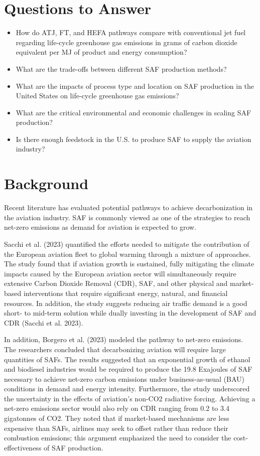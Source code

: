 \documentclass[12pt]{article}
\begin{document}
\begin{Appendix}
\section{Questions to Answer}
\begin{itemize}
    \item How do ATJ, FT, and HEFA pathways compare with conventional jet fuel regarding life-cycle greenhouse gas emissions in grams of carbon dioxide equivalent per MJ of product and energy consumption?
    \item What are the trade-offs between different SAF production methods?
    \item What are the impacts of process type and location on SAF production in the United States on life-cycle greenhouse gas emissions?
    \item What are the critical environmental and economic challenges in scaling SAF production?
    \item Is there enough feedstock in the U.S. to produce SAF to supply the aviation industry?
\end{itemize}

\section{Background}



Recent literature has evaluated potential pathways to achieve decarbonization in the aviation industry. SAF is commonly viewed as one of the strategies to reach net-zero emissions as demand for aviation is expected to grow. 

Sacchi et al. (2023) quantified the efforts needed to mitigate the contribution of the European aviation fleet to global warming through a mixture of approaches. The study found that if aviation growth is sustained, fully mitigating the climate impacts caused by the European aviation sector will simultaneously require extensive Carbon Dioxide Removal (CDR), SAF, and other physical and market-based interventions that require significant energy, natural, and financial resources. In addition, the study suggests reducing air traffic demand is a good short- to mid-term solution while dually investing in the development of SAF and CDR (Sacchi et al. 2023).


In addition, Borgero et al. (2023) modeled the pathway to net-zero emissions. The researchers concluded that decarbonizing aviation will require large quantities of SAFs. The results suggested that an exponential growth of ethanol and biodiesel industries would be required to produce the 19.8 Exajoules of SAF necessary to achieve net-zero carbon emissions under business-as-usual (BAU) conditions in demand and energy intensity. Furthermore, the study underscored the uncertainty in the effects of aviation’s non-CO2 radiative forcing. Achieving a net-zero emissions sector would also rely on CDR ranging from 0.2 to 3.4 gigatonnes of CO2. They noted that if market-based mechanisms are less expensive than SAFs, airlines may seek to offset rather than reduce their combustion emissions; this argument emphasized the need to consider the cost-effectiveness of SAF production. 


\end{Appendix}
\end{document}
